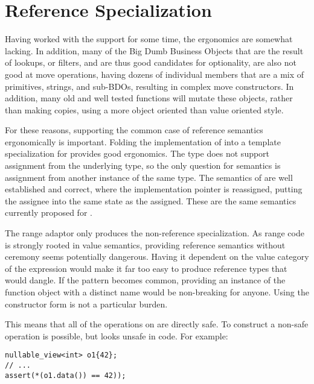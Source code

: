 \documentclass[a4paper,10pt,oneside,openany,final,article]{memoir}
\begin{document}
\section{Reference Specialization}
Having worked with the  support for some time, the ergonomics are somewhat lacking. In addition, many of the Big Dumb Business Objects that are the result of lookups, or filters, and are thus good candidates for optionality, are also not good at move operations, having dozens of individual members that are a mix of primitives, strings, and sub-BDOs, resulting in complex move constructors. In addition, many old and well tested functions will mutate these objects, rather than making copies, using a more object oriented than value oriented style.

For these reasons, supporting the common case of reference semantics ergonomically is important. Folding the implementation of  into a template specialization for  provides good ergonomics. The type   does not support assignment from the underlying type, so the only question for semantics is assignment from another instance of the same type. The semantics of  are well established and correct, where the implementation pointer is reassigned, putting the assignee into the same state as the assigned. These are the same semantics currently proposed for .

The range adaptor  only produces the non-reference specialization. As range code is strongly rooted in value semantics, providing reference semantics without ceremony seems potentially dangerous. Having it dependent on the value category of the expression would make it far too easy to produce reference types that would dangle. If the pattern becomes common, providing an instance of the function object with a distinct name would be non-breaking for anyone. Using the constructor form is not a particular burden.

This means that all of the operations on  are directly safe. To construct a non-safe operation is possible, but looks unsafe in code. For example:

\begin{minipage}[t]{\columnwidth}
  \begin{verbatim}
nullable_view<int> o1{42};
// ...
assert(*(o1.data()) == 42));
  \end{verbatim}
\end{minipage}
\end{document}
